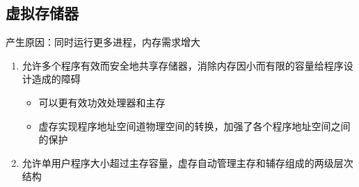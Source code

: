 \subsection{虚拟存储器}
产生原因：同时运行更多进程，内存需求增大
\begin{enumerate}
	\item 允许多个程序有效而安全地共享存储器，消除内存因小而有限的容量给程序设计造成的障碍
	\begin{itemize}
		\item 可以更有效功效处理器和主存
		\item 虚存实现程序地址空间道物理空间的转换，加强了各个程序地址空间之间的保护
	\end{itemize}
	\item 允许单用户程序大小超过主存容量，虚存自动管理主存和辅存组成的两级层次结构
\end{enumerate}
